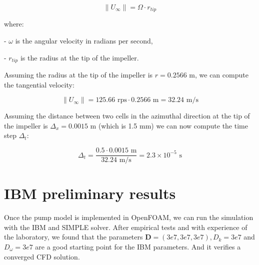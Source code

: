 \begin{equation}
    \|U_{\infty}\| = \Omega \cdot r_{tip}
\end{equation}

where:

- $\omega$ is the angular velocity in radians per second,

- $r_{tip}$ is the radius at the tip of the impeller.

Assuming the radius at the tip of the impeller is $r = 0.2566 \text{ m}$, we can compute the tangential velocity:

\begin{equation}
    \|U_{\infty}\| = 125.66 \text{ rps} \cdot 0.2566 \text{ m} =  \text{32.24 m/s}
\end{equation}

Assuming the distance between two cells in the azimuthal direction at the tip of the impeller is $\Delta_{x} = 0.0015 \text{ m}$ (which is 1.5 mm) we can now compute the time step $\Delta_{t}$:

\begin{equation}
    \Delta_{t} = \frac{0.5 \cdot 0.0015 \text{ m}}{32.24 \text{ m/s}} = 2.3 \times 10^{-5} \text{ s} %
\end{equation}

\newpage









\newpage
\section{IBM preliminary results}%
\label{sec:IBM_preliminary_results}


Once the pump model is implemented in OpenFOAM, we can run the simulation with the IBM and \ac{SIMPLE} solver.
After empirical tests and with experience of the laboratory, we found that the parameters $\mathbf{D} = (3e7, 3e7, 3e7), D_k = 3e7$ and $D_{\omega} = 3e7$ are a good starting point for the IBM parameters. And it verifies a converged CFD solution.

